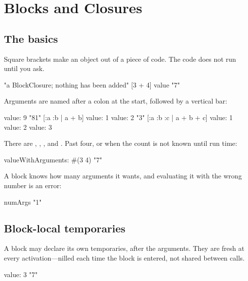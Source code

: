\chapter{Blocks and Closures}
\label{ch:blocks}


\section{The basics}

Square brackets make an object out of a piece of code. The code does not run
until you ask.

\begin{st}
[3 + 4]                  "a BlockClosure; nothing has been added"
[3 + 4] value            "7"
\end{st}

Arguments are named after a colon at the start, followed by a vertical bar:

\begin{st}
[:x | x * x] value: 9                    "81"
[:a :b | a + b] value: 1 value: 2        "3"
[:a :b :c | a + b + c] value: 1 value: 2 value: 3
\end{st}

There are , , ,
 and . Past four, or when
the count is not known until run time:

\begin{st}
[:x :y | x + y] valueWithArguments: #(3 4)      "7"
\end{st}

A block knows how many arguments it wants, and evaluating it with the wrong
number is an error:

\begin{st}
[:x | x] numArgs          "1"
\end{st}

\section{Block-local temporaries}

A block may declare its own temporaries, after the arguments. They are fresh
at every activation---nilled each time the block is entered, not shared
between calls.

\begin{st}
[:x |
    | doubled |
    doubled := x * 2.
    doubled + 1] value: 3                "7"
\end{st}

